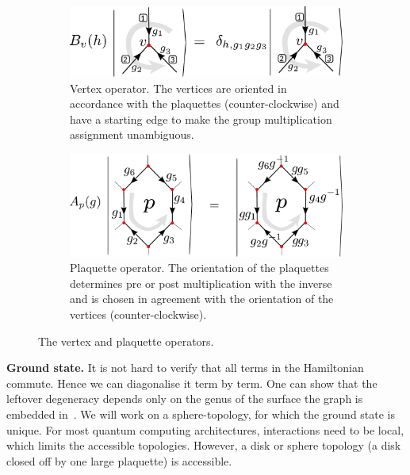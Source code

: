 \documentclass[a4paper,twocolumn,11pt, accepted=2024-06-14]{quantumarticle}
\begin{document}
\begin{figure}
    \centering
    \begin{subfigure}[b]{0.45\textwidth}
        \centering
        \includegraphics[width= \linewidth]{Figures/B_ops.pdf}
        \caption{Vertex operator. The vertices are oriented in accordance with the plaquettes (counter-clockwise) and have a starting edge to make the group multiplication assignment unambiguous.}
        \label{eqn:Bs_def}
    \end{subfigure}\hfill
    \begin{subfigure}[b]{0.45\textwidth}
        \centering
        \includegraphics[width = \linewidth]{Figures/A_ops.pdf}
        \caption{Plaquette operator. The orientation of the plaquettes determines pre or post multiplication with the inverse and is chosen in agreement with the orientation of the vertices (counter-clockwise).}
        \label{eqn:As_def}
    \end{subfigure}\hfill
    \caption{The vertex and plaquette operators.}
    \label{fig:vertex_ops}
\end{figure}

\textbf{Ground state.}
It is not hard to verify that all terms in the Hamiltonian commute. Hence we can diagonalise it term by term. One can show that the leftover degeneracy depends only on the genus of the surface the graph is embedded in~\cite{Kitaev_2003, cui2018topological}. We will work on a sphere-topology, for which the ground state is unique. For most quantum computing architectures, interactions need to be local, which limits the accessible topologies. However, a disk or sphere topology (a disk closed off by one large plaquette) is accessible.
\end{document}

